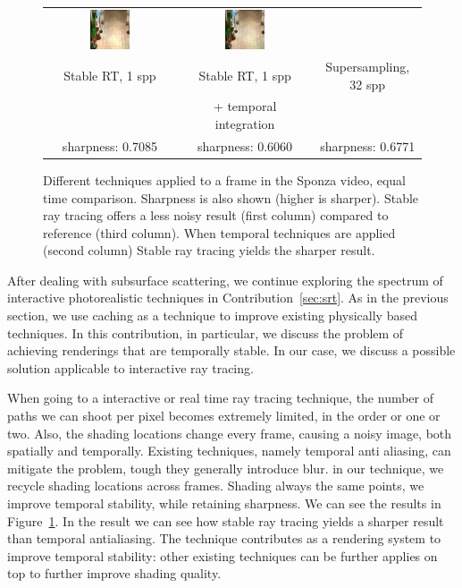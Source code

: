 \begin{figure}[t]
\begin{tabular}{@{}c@{}c@{}@{}c@{}}
	 	 \includegraphics[width=0.32\textwidth]{figures/srt_1_ti_rect_370_300_300_300_frame_211.png} &
	  \includegraphics[width=0.32\textwidth]{figures/ss_32x_rect_370_300_300_300_frame_211.png}
 \\
Stable RT, 1 spp & Stable RT, 1 spp & Supersampling, 32 spp \\
 & + temporal integration &  \\
sharpness: 0.7085 & sharpness: 0.6060 & sharpness: 0.6771 \\[-1.5ex]
\end{tabular}
\caption{Different techniques applied to a frame in the Sponza video, equal time comparison. Sharpness is also shown (higher is sharper). Stable ray tracing offers a less noisy result (first column) compared to reference (third column). When temporal techniques are applied (second column) Stable ray tracing yields the sharper result.  }
\label{fig:sponza_video_frame}
\end{figure}
After dealing with subsurface scattering, we continue exploring the spectrum of interactive photorealistic techniques in Contribution~\ref{sec:srt}. As in the previous section, we use caching as a technique to improve existing physically based techniques. In this contribution, in particular, we discuss the problem of achieving renderings that are temporally stable. In our case, we discuss a possible solution applicable to interactive ray tracing.  

When going to a interactive or real time ray tracing technique, the number of paths we can shoot per pixel becomes extremely limited, in the order or one or two. Also, the shading locations change every frame, causing a noisy image, both spatially and temporally. Existing techniques, namely temporal anti aliasing, can mitigate the problem, tough they generally introduce blur. in our technique, we recycle shading locations across frames. Shading always the same points, we improve temporal stability, while retaining sharpness. We can see the results in Figure~\ref{fig:sponza_video_frame}. In the result we can see how stable ray tracing yields a  sharper result than temporal antialiasing. The technique contributes as a rendering system to improve temporal stability: other existing techniques can be further applies on top to further improve shading quality. 

